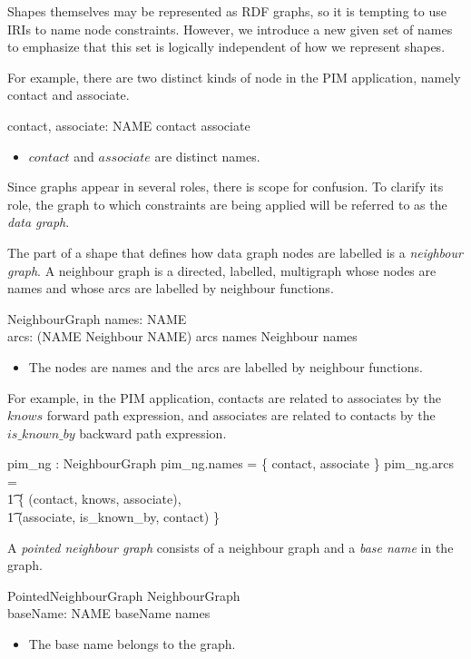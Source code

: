 \documentclass{article}
\begin{document}
Shapes themselves may be represented as RDF graphs, so it is tempting to use IRIs to name node constraints.
However, we introduce a new given set of names to emphasize that this set is logically independent of how we represent shapes.
\begin{zed}
	[NAME]
\end{zed}

For example, there are two distinct kinds of node in the PIM application, namely contact and associate.
\begin{axdef}
	contact, associate: NAME
\where
	contact \neq associate
\end{axdef}
\begin{itemize}
\item $contact$ and $associate$ are distinct names.
\end{itemize}

Since graphs appear in several roles, there is scope for confusion.
To clarify its role, the graph to which constraints are being applied will be referred to as the {\em data graph}.

The part of a shape that defines how data graph nodes are labelled is a {\em neighbour graph}.
A neighbour graph is a directed, labelled, multigraph whose nodes are names and whose
arcs are labelled by neighbour functions.
\begin{schema}{NeighbourGraph}
	names: \finset NAME \\
	arcs: \finset (NAME \cross Neighbour \cross NAME)
\where
	arcs \subseteq names \cross Neighbour \cross names
\end{schema}
\begin{itemize}
\item The nodes are names and the arcs are labelled by neighbour functions.
\end{itemize}

For example, in the PIM application, contacts are related to associates by the $knows$ forward path expression, and associates
are related to contacts by the $is\_known\_by$ backward path expression.
\begin{axdef}
	pim\_ng : NeighbourGraph
\where
	pim\_ng.names = \{ contact, associate \}
\also
	pim\_ng.arcs = \\
\t1		\{ (contact, knows, associate), \\
\t1		(associate, is\_known\_by, contact) \}
\end{axdef}

A {\em pointed neighbour graph} consists of a neighbour graph and a {\em base name} in the graph.
\begin{schema}{PointedNeighbourGraph}
	NeighbourGraph \\
	baseName: NAME
\where
	baseName \in names
\end{schema}
\begin{itemize}
\item The base name belongs to the graph.
\end{itemize}
\end{document}
